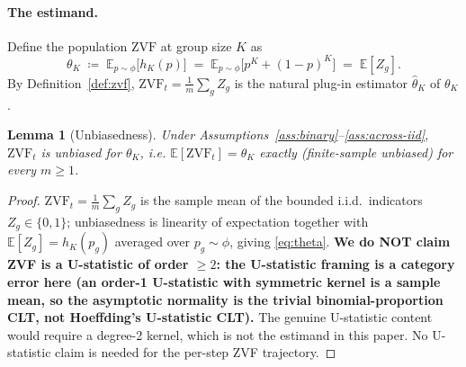 \documentclass[11pt]{article}
\theoremstyle{plain}
\newtheorem{lemma}{Lemma}
\theoremstyle{definition}
\theoremstyle{remark}
\newcommand{\ZVF}{\ensuremath{\mathrm{ZVF}}}
\newcommand{\E}{\mathbb{E}}
\newcommand{\1}{\mathbb{1}}
\begin{document}
\paragraph{The estimand.} Define the population \ZVF{} at group size $K$ as
\begin{equation}\label{eq:theta}
\theta_K \;\coloneqq\; \E_{p\sim\phi}\big[h_K(p)\big]
\;=\; \E_{p\sim\phi}\big[p^{K}+(1-p)^{K}\big] \;=\; \E[Z_g].
\end{equation}
By Definition~\ref{def:zvf}, $\ZVF_t = \frac1m\sum_{g} Z_g$ is the natural
plug-in estimator $\widehat\theta_K$ of $\theta_K$.

\begin{lemma}[Unbiasedness]\label{lem:ustat}
Under Assumptions~\ref{ass:binary}--\ref{ass:across-iid}, $\ZVF_t$ is
unbiased for $\theta_K$, i.e. $\E[\ZVF_t]=\theta_K$ exactly (finite-sample
unbiased) for every $m\ge 1$.
\end{lemma}
\begin{proof}
$\ZVF_t = \frac1m\sum_g Z_g$ is the sample mean of the bounded i.i.d.\
indicators $Z_g\in\{0,1\}$; unbiasedness is linearity of expectation
together with $\E[Z_g]=h_K(p_g)$ averaged over $p_g\sim\phi$, giving
\eqref{eq:theta}. \textbf{We do NOT claim ZVF is a U-statistic of
order $\ge 2$: the U-statistic framing is a category error here (an
order-1 U-statistic with symmetric kernel is a sample mean, so the
asymptotic normality is the trivial binomial-proportion CLT, not
Hoeffding's U-statistic CLT).} The genuine U-statistic content would
require a degree-2 kernel, which is not the estimand in this paper. No
U-statistic claim is needed for the per-step ZVF trajectory.
\end{proof}
\end{document}

